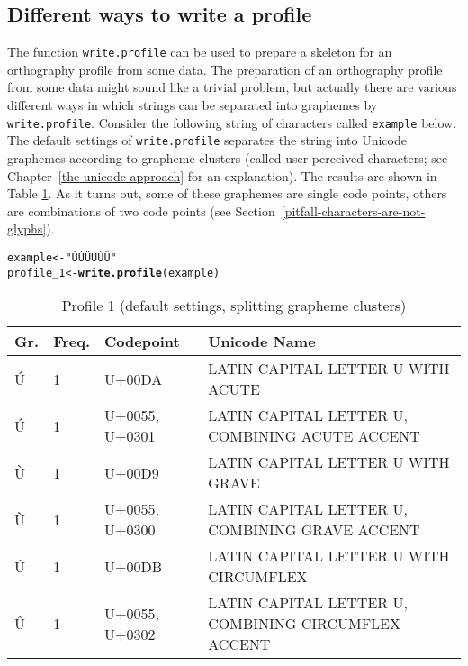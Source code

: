 \documentclass[output=book,nonflat,modfonts,
colorlinks, citecolor=brown,
		]{langsci/langscibook}\usepackage[]{graphicx}\usepackage[]{color}
\makeatletter
\newcommand{\hlstr}[1]{\textcolor[rgb]{0.192,0.494,0.8}{#1}}%
\newcommand{\hlstd}[1]{\textcolor[rgb]{0.345,0.345,0.345}{#1}}%
\newcommand{\hlkwb}[1]{\textcolor[rgb]{0.69,0.353,0.396}{#1}}%
\newcommand{\hlkwd}[1]{\textcolor[rgb]{0.737,0.353,0.396}{\textbf{#1}}}%
\newenvironment{kframe}{%
 \def\at@end@of@kframe{}%
 \ifinner\ifhmode%
  \def\at@end@of@kframe{\end{minipage}}%
  \begin{minipage}{\columnwidth}%
 \fi\fi%
 \def\FrameCommand##1{\hskip\@totalleftmargin \hskip-\fboxsep
 \colorbox{shadecolor}{##1}\hskip-\fboxsep
     \hskip-\linewidth \hskip-\@totalleftmargin \hskip\columnwidth}%
 \MakeFramed {\advance\hsize-\width
   \@totalleftmargin\z@ \linewidth\hsize
   \@setminipage}}%
 {\par\unskip\endMakeFramed%
 \at@end@of@kframe}
\newenvironment{knitrout}{}{} %
\makeatother
\begin{document}
\subsection*{Different ways to write a profile}
\label{write-profile}

The function \texttt{write.profile} can be used to prepare a skeleton for an
orthography profile from some data. The preparation of an orthography profile
from some data might sound like a trivial problem, but actually there are
various different ways in which strings can be separated into graphemes by
\texttt{write.profile}. Consider the following string of characters called
\texttt{example} below. The default settings of \texttt{write.profile} separates
the string into Unicode graphemes according to grapheme clusters (called user-perceived characters; see Chapter~\ref{the-unicode-approach} for an explanation). The results are shown 
in Table \ref {tab:profile1}. As it 
turns out, some of these graphemes are single code points, others are combinations
of two code points (see Section~\ref{pitfall-characters-are-not-glyphs}).

\begin{knitrout}\footnotesize
{}\color{fgcolor}\begin{kframe}
\begin{alltt}
\hlstd{example} \hlkwb{<-} \hlstr{"ÙÚÛÙÚÛ"}
\hlstd{profile_1} \hlkwb{<-} \hlkwd{write.profile}\hlstd{(example)}
\end{alltt}
\end{kframe}
\end{knitrout}

\begin{table}[H]
\centering
\begingroup\scriptsize
\begin{tabular}{llll}
  \toprule
Gr. & Freq. & Codepoint & Unicode Name \\ 
  \midrule
Ú & 1 & U+00DA & LATIN CAPITAL LETTER U WITH ACUTE \\ 
  Ú & 1 & U+0055, U+0301 & LATIN CAPITAL LETTER U, COMBINING ACUTE ACCENT \\ 
  Ù & 1 & U+00D9 & LATIN CAPITAL LETTER U WITH GRAVE \\ 
  Ù & 1 & U+0055, U+0300 & LATIN CAPITAL LETTER U, COMBINING GRAVE ACCENT \\ 
  Û & 1 & U+00DB & LATIN CAPITAL LETTER U WITH CIRCUMFLEX \\ 
  Û & 1 & U+0055, U+0302 & LATIN CAPITAL LETTER U, COMBINING CIRCUMFLEX ACCENT \\ 
   \bottomrule
\end{tabular}
\endgroup
\caption{Profile 1 (default settings, splitting grapheme clusters)} 
\label{tab:profile1}
\end{table}
\end{document}
